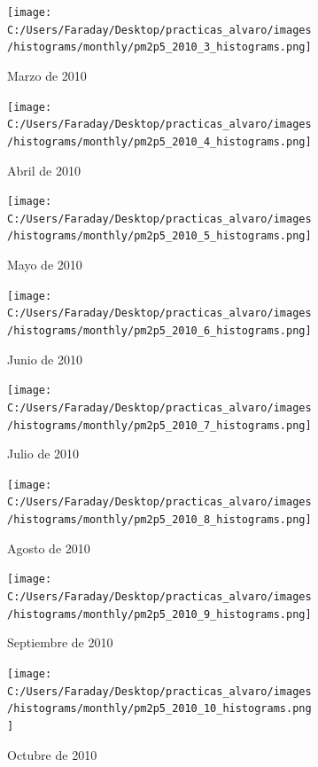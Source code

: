 \documentclass[12pt]{article}
\begin{document}
\begin{figure}[H]
\centering
\begin{subfigure}[h]{0.45\textwidth}
\texttt{[image: C:/Users/Faraday/Desktop/practicas\_alvaro/images/histograms/monthly/pm2p5\_2010\_3\_histograms.png]}
\caption{Marzo de 2010}
\label{fig:hist-mon-4-3-2010}
\end{subfigure}
%
\begin{subfigure}[H]{0.45\textwidth}
\texttt{[image: C:/Users/Faraday/Desktop/practicas\_alvaro/images/histograms/monthly/pm2p5\_2010\_4\_histograms.png]}
\caption{Abril de 2010}
\label{fig:hist-mon-4-4-2010}
\end{subfigure}
\caption{}
\end{figure}

\begin{figure}[H]
\centering
\begin{subfigure}[h]{0.45\textwidth}
\texttt{[image: C:/Users/Faraday/Desktop/practicas\_alvaro/images/histograms/monthly/pm2p5\_2010\_5\_histograms.png]}
\caption{Mayo de 2010}
\label{fig:hist-mon-4-5-2010}
\end{subfigure}
%
\begin{subfigure}[H]{0.45\textwidth}
\texttt{[image: C:/Users/Faraday/Desktop/practicas\_alvaro/images/histograms/monthly/pm2p5\_2010\_6\_histograms.png]}
\caption{Junio de 2010}
\label{fig:hist-mon-4-6-2010}
\end{subfigure}
\caption{}
\end{figure}

\newpage

\begin{figure}[H]
\centering
\begin{subfigure}[h]{0.45\textwidth}
\texttt{[image: C:/Users/Faraday/Desktop/practicas\_alvaro/images/histograms/monthly/pm2p5\_2010\_7\_histograms.png]}
\caption{Julio de 2010}
\label{fig:hist-mon-4-7-2010}
\end{subfigure}
%
\begin{subfigure}[H]{0.45\textwidth}
\texttt{[image: C:/Users/Faraday/Desktop/practicas\_alvaro/images/histograms/monthly/pm2p5\_2010\_8\_histograms.png]}
\caption{Agosto de 2010}
\label{fig:hist-mon-4-8-2010}
\end{subfigure}
\caption{}
\end{figure}

\begin{figure}[H]
\centering
\begin{subfigure}[h]{0.45\textwidth}
\texttt{[image: C:/Users/Faraday/Desktop/practicas\_alvaro/images/histograms/monthly/pm2p5\_2010\_9\_histograms.png]}
\caption{Septiembre de 2010}
\label{fig:hist-mon-4-9-2010}
\end{subfigure}
%
\begin{subfigure}[H]{0.45\textwidth}
\texttt{[image: C:/Users/Faraday/Desktop/practicas\_alvaro/images/histograms/monthly/pm2p5\_2010\_10\_histograms.png]}
\caption{Octubre de 2010}
\label{fig:hist-mon-4-10-2010}
\end{subfigure}
\caption{}
\end{figure}
\end{document}
